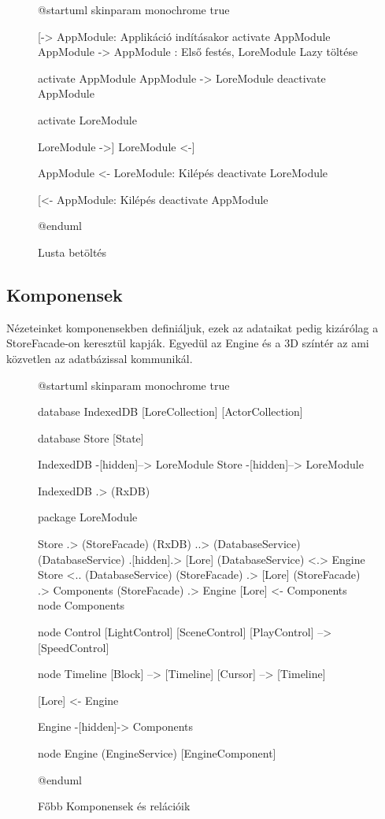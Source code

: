\begin{figure}[h!]
	\centering
	\begin{plantuml}
		@startuml
		skinparam monochrome true

		[-> AppModule: Applikáció indításakor
		activate AppModule
		AppModule -> AppModule : Első festés, LoreModule Lazy töltése

		activate  AppModule
		AppModule -> LoreModule
		deactivate AppModule

		activate LoreModule

		LoreModule ->]
		LoreModule <-]


		AppModule <- LoreModule: Kilépés
		deactivate LoreModule

		[<- AppModule: Kilépés
		deactivate AppModule

		@enduml


	\end{plantuml}
	\caption{Lusta betöltés}
	\label{fig:lazy-loading}
\end{figure}


\subsection{Komponensek}

Nézeteinket komponensekben definiáljuk, ezek az adataikat pedig kizárólag a StoreFacade-on keresztül kapják. Egyedül az Engine és a 3D színtér az ami közvetlen az adatbázissal kommunikál.

\begin{figure}[h!]
	\centering
	\begin{plantuml}
		@startuml
		skinparam monochrome true

		database IndexedDB {
			[LoreCollection]
			[ActorCollection]
		}

		database Store {
			[State]
		}

		IndexedDB -[hidden]--> LoreModule
		Store -[hidden]--> LoreModule

		IndexedDB .> (RxDB)


		package LoreModule {
			Store .> (StoreFacade)
			(RxDB) ..> (DatabaseService)
			(DatabaseService) .[hidden].> [Lore]
			(DatabaseService) <.> Engine
			Store <.. (DatabaseService)
			(StoreFacade) .> [Lore]
			(StoreFacade) .> Components
			(StoreFacade) .> Engine
			[Lore] <- Components
			node Components {

				node Control {
					[LightControl]
					[SceneControl]
					[PlayControl] --> [SpeedControl]
				}


				node Timeline {
					[Block] --> [Timeline]
					[Cursor] --> [Timeline]
				}
			}

			[Lore] <- Engine

			Engine -[hidden]-> Components

			node Engine {
				(EngineService)
				[EngineComponent]
			}


		}


		@enduml
	\end{plantuml}
	\caption{Főbb Komponensek és relációik}
	\label{fig:services-and-components}
\end{figure}


